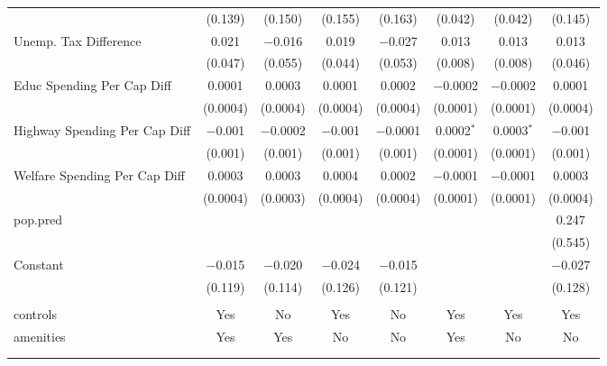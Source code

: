 \begin{table}[!htbp]
\begin{tabular}{@{\extracolsep{5pt}}lccccccc}
  & (0.139) & (0.150) & (0.155) & (0.163) & (0.042) & (0.042) & (0.145) \\ 
  Unemp. Tax Difference & 0.021 & $-$0.016 & 0.019 & $-$0.027 & 0.013 & 0.013 & 0.013 \\ 
  & (0.047) & (0.055) & (0.044) & (0.053) & (0.008) & (0.008) & (0.046) \\ 
  Educ Spending Per Cap Diff & 0.0001 & 0.0003 & 0.0001 & 0.0002 & $-$0.0002 & $-$0.0002 & 0.0001 \\ 
  & (0.0004) & (0.0004) & (0.0004) & (0.0004) & (0.0001) & (0.0001) & (0.0004) \\ 
  Highway Spending Per Cap Diff & $-$0.001 & $-$0.0002 & $-$0.001 & $-$0.0001 & 0.0002$^{*}$ & 0.0003$^{*}$ & $-$0.001 \\ 
  & (0.001) & (0.001) & (0.001) & (0.001) & (0.0001) & (0.0001) & (0.001) \\ 
  Welfare Spending Per Cap Diff & 0.0003 & 0.0003 & 0.0004 & 0.0002 & $-$0.0001 & $-$0.0001 & 0.0003 \\ 
  & (0.0004) & (0.0003) & (0.0004) & (0.0004) & (0.0001) & (0.0001) & (0.0004) \\ 
  pop.pred &  &  &  &  &  &  & 0.247 \\ 
  &  &  &  &  &  &  & (0.545) \\ 
  Constant & $-$0.015 & $-$0.020 & $-$0.024 & $-$0.015 &  &  & $-$0.027 \\ 
  & (0.119) & (0.114) & (0.126) & (0.121) &  &  & (0.128) \\ 
 \hline \\[-1.8ex] 
controls & Yes & No & Yes & No & Yes & Yes & Yes \\ 
amenities & Yes & Yes & No & No & Yes & No & No \\ 
\hline \\[-1.8ex] 
\hline 
\hline \\[-1.8ex] 
\end{tabular} 
\end{table} 
